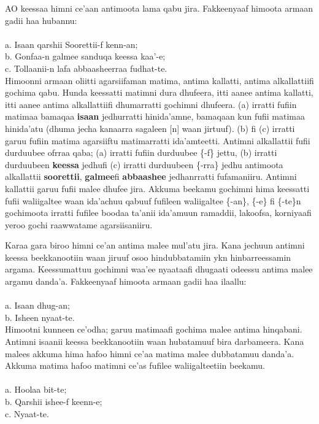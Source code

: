 \documentclass[11pt,b5paper]{book}
\begin{document}
AO keessaa himni ce’aan antimoota lama qabu jira. Fakkeenyaaf himoota armaan gadii haa hubannu:\\
\\
a. Isaan qarshii Soorettii-f kenn-an; \\
b. Gonfaa-n galmee sanduqa keessa kaa’-e; \\
c. Tollaanii-n lafa abbaasheerraa fudhat-te.\\

Himoonni armaan oliitti agarsiifaman matima, antima kallatti, antima alkallattiifi gochima qabu. Hunda keessatti matimni dura dhufeera, itti aanee antima kallatti, itti aanee antima alkallattiifi dhumarratti gochimni dhufeera. (a) irratti fufiin matimaa bamaqaa \textbf{isaan} jedhurratti hinida’amne, bamaqaan kun fufii matimaa hinida’atu (dhuma jecha kanaarra sagaleen [n] waan jirtuuf). (b) fi (c) irratti garuu fufiin matima agarsiiftu matimarratti ida’amteetti. Antimni alkallattii fufii
durduubee ofrraa qaba; (a) irratti fufiin durduubee \{-f\} jettu, (b) irratti durduubeen \textbf{keessa} jedhufi (c) irratti durduubeen \{-rra\} jedhu antimoota alkallattii \textbf{soorettii}, \textbf{galmee}fi \textbf{abbaashee} jedhanrratti fufamaniiru. Antimni kallattii garuu fufii malee dhufee jira. Akkuma beekamu gochimni hima keessatti fufii waliigaltee waan ida’achuu qabuuf fufileen waliigaltee \{-an\}, \{-e\} fi \{-te\}n gochimoota irratti fufilee boodaa ta’anii ida’amuun ramaddii, lakoofsa, korniyaafi yeroo gochi raawwatame agarsiisaniiru.

Karaa gara biroo himni ce’an antima malee mul’atu jira. Kana jechuun antimni keessa beekkanootiin waan jiruuf osoo hindubbatamiin ykn hinbarreessamin argama. Keessumattuu gochimni waa’ee nyaataafi dhugaati odeessu antima malee argamu danda’a. Fakkeenyaaf himoota armaan gadii haa ilaallu:\\
\\
a. Isaan dhug-an; \\
b. Isheen nyaat-te.\\

Himootni kunneen ce’odha; garuu matimaafi gochima malee antima hinqabani. Antimni isaanii keessa beekkanootiin waan hubatamuuf bira darbameera. Kana malees akkuma hima hafoo himni ce’aa matima malee dubbatamuu danda’a. Akkuma matima hafoo matimni ce’as fufilee waliigalteetiin beekamu.\\
\\
a. Hoolaa bit-te; \\
b. Qarshii ishee-f keenn-e; \\
c. Nyaat-te.\\
\end{document}
